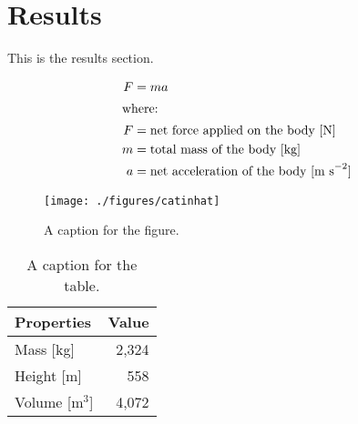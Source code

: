 \pagebreak
\section{Results}
\label{sec:results}

This is the results section.

\begin{align}
	F &= ma \\
	\intertext{where:}
	F &= \text{net force applied on the body [N]} \nonumber \\
	m &= \text{total mass of the body [kg]} \nonumber \\
	a &= \text{net acceleration of the body [m s}^{-2}\text{]} \nonumber
\end{align}

\begin{figure}[htbp!]
	\begin{center}
		\texttt{[image: ./figures/catinhat]}
	\end{center}
	\caption{A caption for the figure.}
	\label{fig:catinhat}
\end{figure}

\begin{table}[h]
	\centering
        \caption{A caption for the table.}
\begin{tabular}{lr}
	\hline
	\textbf{Properties} & \textbf{Value} \\
	\hline
    Mass [kg] & 2,324 \\
    Height [m] & 558 \\
    Volume [m$^3$] & 4,072 \\
    \hline
\end{tabular}
\label{tab:table1}
\end {table}
